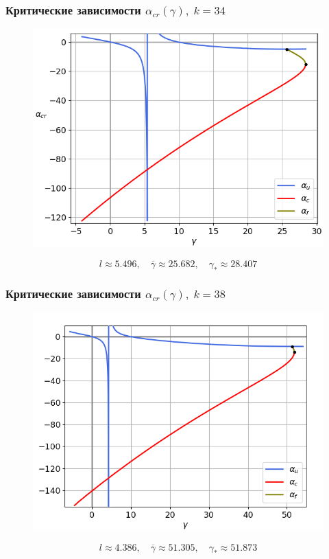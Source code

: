 \documentclass[fullscreen=true, unicode, bookmarks=false]{beamer}
\begin{document}
\begin{frame}
\frametitle{ Критические зависимости $ \alpha_{cr}(\gamma), \; k = 34 $ }

\begin{figure} 
\includegraphics[scale=0.55]{alphas_067.png}  
\end{figure}
$$ l \approx 5.496, \quad \overline{\gamma} \approx 25.682, \quad \gamma_* \approx 28.407 $$

\end{frame}

\begin{frame}
\frametitle{ Критические зависимости $ \alpha_{cr}(\gamma), \; k = 38 $ }

\begin{figure} 
\includegraphics[scale=0.55]{alphas_075.png}  
\end{figure}
$$ l \approx 4.386, \quad \overline{\gamma} \approx 51.305, \quad \gamma_* \approx 51.873 $$

\end{frame}
\end{document}
